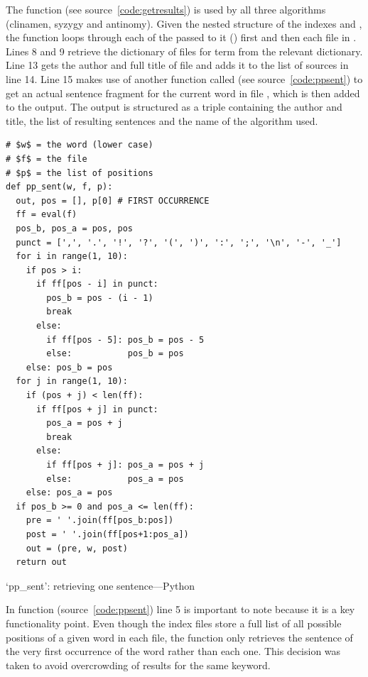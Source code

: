 The  function (see source~\ref{code:getresults}) is used by all three algorithms (clinamen, syzygy and antinomy). Given the nested structure of the indexes  and , the function loops through each of the  passed to it () first and then each file in . Lines 8 and 9 retrieve the dictionary of files for term  from the relevant dictionary. Line 13 gets the author and full title of file  and adds it to the list of sources in line 14. Line 15 makes use of another function called  (see source~\ref{code:ppsent}) to get an actual sentence fragment for the current word  in file , which is then added to the output. The output is structured as a triple containing the author and title, the list of resulting sentences and the name of the algorithm used.

\begin{listing}[!htbp] %
  \begin{verbatim}
# $w$ = the word (lower case)
# $f$ = the file
# $p$ = the list of positions
def pp_sent(w, f, p):
  out, pos = [], p[0] # FIRST OCCURRENCE
  ff = eval(f)
  pos_b, pos_a = pos, pos
  punct = [',', '.', '!', '?', '(', ')', ':', ';', '\n', '-', '_']
  for i in range(1, 10):
    if pos > i:
      if ff[pos - i] in punct:
        pos_b = pos - (i - 1)
        break
      else:
        if ff[pos - 5]: pos_b = pos - 5
        else:           pos_b = pos
    else: pos_b = pos
  for j in range(1, 10):
    if (pos + j) < len(ff):
      if ff[pos + j] in punct:
        pos_a = pos + j
        break
      else:
        if ff[pos + j]: pos_a = pos + j
        else:           pos_a = pos
    else: pos_a = pos
  if pos_b >= 0 and pos_a <= len(ff):
    pre = ' '.join(ff[pos_b:pos])
    post = ' '.join(ff[pos+1:pos_a])
    out = (pre, w, post)
  return out
  \end{verbatim}
\caption[`pp\_sent' function---Python]{`pp\_sent': retrieving one sentence---Python}
\label{code:ppsent}
\end{listing}

In function  (source~\ref{code:ppsent}) line 5 is important to note because it is a key functionality point. Even though the index files store a full list of all possible positions of a given word in each file, the  function only retrieves the sentence of the very first occurrence of the word rather than each one. This decision was taken to avoid overcrowding of results for the same keyword.

